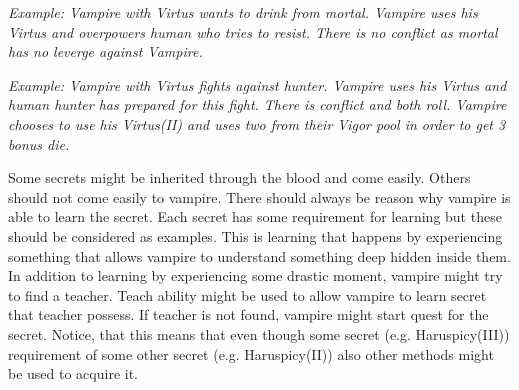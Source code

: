 \textit{Example: 
Vampire with Virtus wants to drink from mortal. 
Vampire uses his Virtus and overpowers human who tries to resist.
There is no conflict as mortal has no leverge against Vampire.}

\textit{
Example: 
Vampire with Virtus fights against hunter.
Vampire uses his Virtus and human hunter has prepared for this fight.
There is conflict and both roll. Vampire chooses to use his Virtus(II) and uses two from their Vigor pool in order to get 3 bonus die.}

Some secrets might be inherited through the blood and come easily.
Others should not come easily to vampire.
There should always be reason why vampire is able to learn the secret.
Each secret has some requirement for learning but these should be considered as examples.
This is learning that happens by experiencing something that allows vampire to understand something deep hidden inside them.
In addition to learning by experiencing some drastic moment, vampire might try to find a teacher.
Teach ability might be used to allow vampire to learn secret that teacher possess.
If teacher is not found, vampire might start quest for the secret.
Notice, that this means that even though some secret (e.g. Haruspicy(III)) requirement of some other secret (e.g. Haruspicy(II)) also other methods might be used to acquire it.

\pagebreak
\cols{
\SecretVampiricBase{}
\VampiricAbility{}
\VampiricSecret{}
\VampiricKey{}
}

